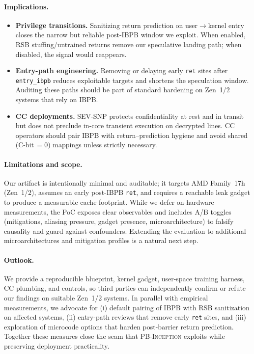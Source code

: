 \documentclass[11pt,a4paper]{article}
\begin{document}
\paragraph{Implications.}
\begin{itemize}
  \item \textbf{Privilege transitions.} Sanitizing return prediction on user$\rightarrow$kernel entry closes the narrow but reliable post-IBPB window we exploit. When enabled, RSB stuffing/untrained returns remove our speculative landing path; when disabled, the signal would reappears.
  \item \textbf{Entry-path engineering.} Removing or delaying early \texttt{ret} sites after \texttt{entry\_ibpb} reduces exploitable targets and shortens the speculation window. Auditing these paths should be part of standard hardening on Zen~1/2 systems that rely on IBPB.
  \item \textbf{CC deployments.} SEV-SNP protects confidentiality at rest and in transit but does not preclude in-core transient execution on decrypted lines. CC operators should pair IBPB with return–prediction hygiene and avoid shared (C-bit\,$=0$) mappings unless strictly necessary.
\end{itemize}

\paragraph{Limitations and scope.}
Our artifact is intentionally minimal and auditable; it targets AMD Family~17h (Zen~1/2), assumes an early post-IBPB \texttt{ret}, and requires a reachable leak gadget to produce a measurable cache footprint. While we defer on-hardware measurements, the PoC exposes clear observables and includes A/B toggles (mitigations, aliasing pressure, gadget presence, microarchitecture) to falsify causality and guard against confounders. Extending the evaluation to additional microarchitectures and mitigation profiles is a natural next step.

\paragraph{Outlook.}
We provide a reproducible blueprint, kernel gadget, user-space training harness, CC plumbing, and controls, so third parties can independently confirm or refute our findings on suitable Zen~1/2 systems. In parallel with empirical measurements, we advocate for (i) default pairing of IBPB with RSB sanitization on affected systems, (ii) entry-path reviews that remove early \texttt{ret} sites, and (iii) exploration of microcode options that harden post-barrier return prediction. Together these measures close the seam that \textsc{PB-Inception} exploits while preserving deployment practicality.
\end{document}
